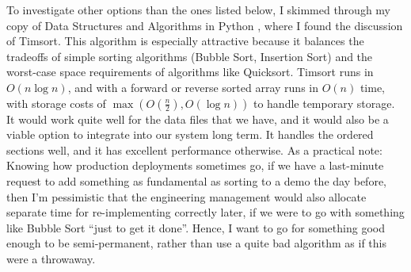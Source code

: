 \documentclass[10pt,letterpaper,final]{report}
\begin{document}
To investigate other options than the ones listed below, I skimmed through my copy of Data Structures and Algorithms in Python \parencite{LaforeEtAl2019DataStructuresAndAlgorithmsInPython}, where I found the discussion of Timsort. This algorithm is especially attractive because it balances the tradeoffs of simple sorting algorithms (Bubble Sort, Insertion Sort) and the worst-case space requirements of algorithms like Quicksort. Timsort runs in $O(n \log n)$, and with a forward or reverse sorted array runs in $O(n)$ time, with storage costs of $\max (O(\frac{n}{2}), O(\log n))$ to handle temporary storage. It would work quite well for the data files that we have, and it would also be a viable option to integrate into our system long term. It handles the ordered sections well, and it has excellent performance otherwise. As a practical note: Knowing how production deployments sometimes go, if we have a last-minute request to add something as fundamental as sorting to a demo the day before, then I'm pessimistic that the engineering management would also allocate separate time for re-implementing correctly later, if we were to go with something like Bubble Sort ``just to get it done''. Hence, I want to go for something good enough to be semi-permanent, rather than use a quite bad algorithm as if this were a throwaway.
\end{document}
